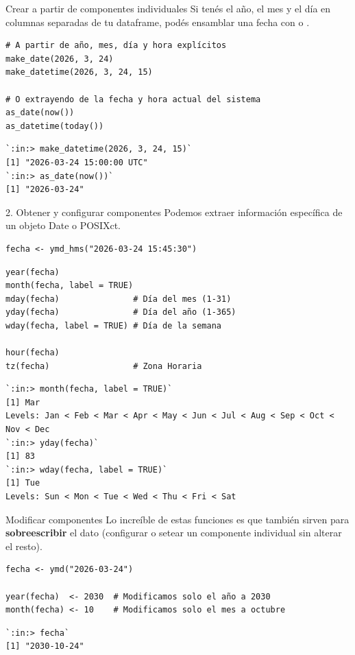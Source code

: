 \documentclass[8pt]{beamer}
\begin{document}
	\begin{frame}[fragile]{Crear a partir de componentes individuales}
		Si tenés el año, el mes y el día en columnas separadas de tu dataframe, podés ensamblar una fecha con  o .
		
\begin{lstlisting}[style=RScript]
# A partir de año, mes, día y hora explícitos
make_date(2026, 3, 24)
make_datetime(2026, 3, 24, 15)

# O extrayendo de la fecha y hora actual del sistema
as_date(now())
as_datetime(today())
\end{lstlisting}
\begin{lstlisting}[style=RConsole]
`:in:> make_datetime(2026, 3, 24, 15)`
[1] "2026-03-24 15:00:00 UTC"
`:in:> as_date(now())`
[1] "2026-03-24"
\end{lstlisting}
	\end{frame}


	\begin{frame}[fragile]{2. Obtener y configurar componentes}
		Podemos extraer información específica de un objeto Date o POSIXct.
		
\begin{lstlisting}[style=RScript]
fecha <- ymd_hms("2026-03-24 15:45:30")
\end{lstlisting}

\begin{lstlisting}[style=RScript]
year(fecha)
month(fecha, label = TRUE)
mday(fecha)               # Día del mes (1-31)
yday(fecha)               # Día del año (1-365)
wday(fecha, label = TRUE) # Día de la semana

hour(fecha)
tz(fecha)                 # Zona Horaria
\end{lstlisting}
\begin{lstlisting}[style=RConsole]
`:in:> month(fecha, label = TRUE)`
[1] Mar
Levels: Jan < Feb < Mar < Apr < May < Jun < Jul < Aug < Sep < Oct < Nov < Dec
`:in:> yday(fecha)`
[1] 83
`:in:> wday(fecha, label = TRUE)`
[1] Tue
Levels: Sun < Mon < Tue < Wed < Thu < Fri < Sat
\end{lstlisting}
	\end{frame}
	
	\begin{frame}[fragile]{Modificar componentes}
		Lo increíble de estas funciones es que también sirven para \textbf{sobreescribir} el dato (configurar o setear un componente individual sin alterar el resto).
		
\begin{lstlisting}[style=RScript]
fecha <- ymd("2026-03-24")

year(fecha)  <- 2030  # Modificamos solo el año a 2030
month(fecha) <- 10    # Modificamos solo el mes a octubre
\end{lstlisting}
\begin{lstlisting}[style=RConsole]
`:in:> fecha`
[1] "2030-10-24"
\end{lstlisting}
	\end{frame}
\end{document}
